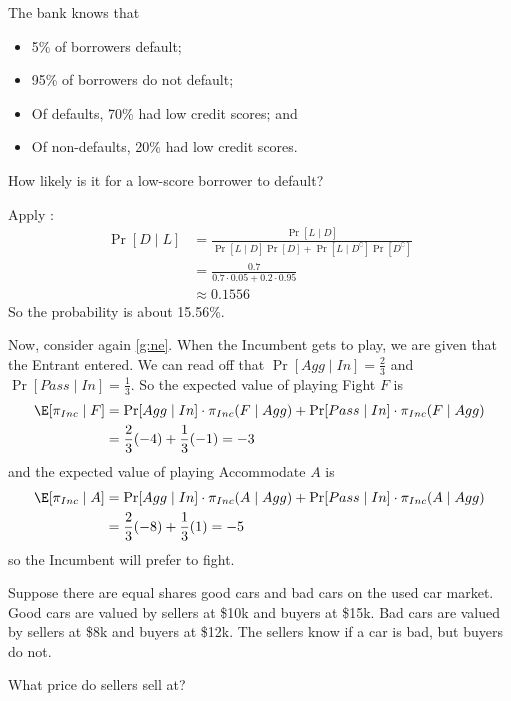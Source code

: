 \documentclass[class=bu430,notes,tikz]{agony}
\begin{document}
\begin{example}
  The bank knows that
  \begin{itemize}[nosep]
    \item 5\% of borrowers default;
    \item 95\% of borrowers do not default;
    \item Of defaults, 70\% had low credit scores; and
    \item Of non-defaults, 20\% had low credit scores.
  \end{itemize}
  How likely is it for a low-score borrower to default?
\end{example}
\begin{sol}
  Apply :
  \begin{align*}
    \Pr[D \mid L]
     & = \frac{\Pr[L \mid D]}{\Pr[L \mid D]\Pr[D] + \Pr[L \mid D^\complement]\Pr[D^\complement]} \\
     & = \frac{0.7}{0.7\cdot 0.05 + 0.2\cdot 0.95}                                               \\
     & \approx 0.1556
  \end{align*}
  So the probability is about 15.56\%.
\end{sol}

Now, consider again \cref{g:ne}.
When the Incumbent gets to play, we are given that the Entrant entered.
We can read off that $\Pr[Agg \mid In] = \frac23$ and $\Pr[Pass \mid In] = \frac13$.
So the expected value of playing Fight $F$ is
\begin{align*}
  \E[\pi_{Inc} \mid F]
   & = \Pr[Agg \mid In] \cdot \pi_{Inc}(F \mid Agg) + \Pr[Pass \mid In]\cdot \pi_{Inc}(F \mid Agg) \\
   & = \frac23(-4) + \frac13(-1) = -3
\end{align*}
and the expected value of playing Accommodate $A$ is
\begin{align*}
  \E[\pi_{Inc} \mid A]
   & = \Pr[Agg \mid In] \cdot \pi_{Inc}(A \mid Agg) + \Pr[Pass \mid In]\cdot \pi_{Inc}(A \mid Agg) \\
   & = \frac23(-8) + \frac13(1) = -5
\end{align*}
so the Incumbent will prefer to fight.

\begin{game}
  Suppose there are equal shares good cars and bad cars on the used car market.
  Good cars are valued by sellers at \$10k and buyers at \$15k.
  Bad cars are valued by sellers at \$8k and buyers at \$12k.
  The sellers know if a car is bad, but buyers do not.

  What price do sellers sell at?
\end{game}
\end{document}

